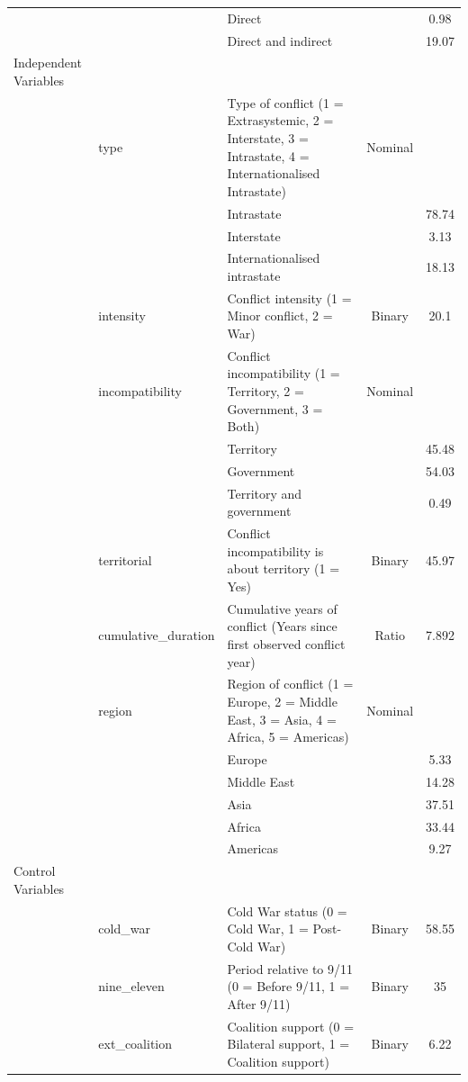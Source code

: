 \documentclass[
]{article}
\begin{document}
\begin{landscape}
\begin{longtable}[t]{ll>{\raggedright\arraybackslash}p{6cm}cc}
 &  & Direct &  & 0.98\\
 &  & Direct and indirect &  & 19.07\\
Independent Variables &  &  &  & \\
 & type & Type of conflict (1 = Extrasystemic, 2 = Interstate, 3 = Intrastate, 4 = Internationalised Intrastate) & Nominal & \\
\addlinespace
 &  & Intrastate &  & 78.74\\
 &  & Interstate &  & 3.13\\
 &  & Internationalised intrastate &  & 18.13\\
 & intensity & Conflict intensity (1 = Minor conflict, 2 = War) & Binary & 20.1\\
 & incompatibility & Conflict incompatibility (1 = Territory, 2 = Government, 3 = Both) & Nominal & \\
\addlinespace
 &  & Territory &  & 45.48\\
 &  & Government &  & 54.03\\
 &  & Territory and government &  & 0.49\\
 & territorial & Conflict incompatibility is about territory (1 = Yes) & Binary & 45.97\\
 & cumulative\_duration & Cumulative years of conflict (Years since first observed conflict year) & Ratio & 7.892\\
\addlinespace
 & region & Region of conflict (1 = Europe, 2 = Middle East, 3 = Asia, 4 = Africa, 5 = Americas) & Nominal & \\
 &  & Europe &  & 5.33\\
 &  & Middle East &  & 14.28\\
 &  & Asia &  & 37.51\\
 &  & Africa &  & 33.44\\
\addlinespace
 &  & Americas &  & 9.27\\
Control Variables &  &  &  & \\
 & cold\_war & Cold War status (0 = Cold War, 1 = Post-Cold War) & Binary & 58.55\\
 & nine\_eleven & Period relative to 9/11 (0 = Before 9/11, 1 = After 9/11) & Binary & 35\\
 & ext\_coalition & Coalition support (0 = Bilateral support, 1 = Coalition support) & Binary & 6.22\\*
\end{longtable}
\endgroup{}
\end{landscape}
\end{document}
